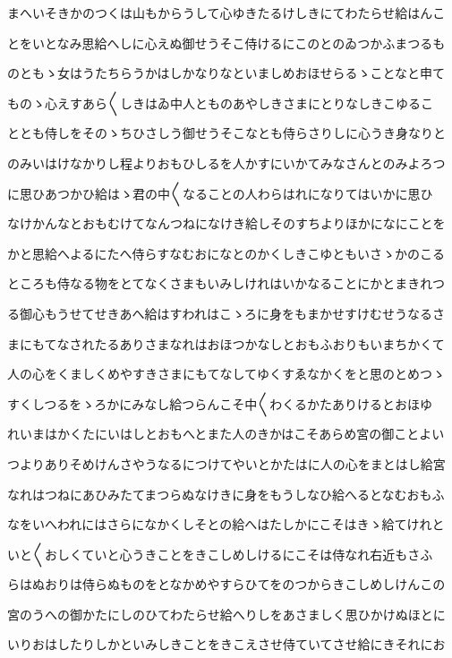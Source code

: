 \documentclass[a4paper,11pt,landscape]{ltjtarticle}
\begin{document}
まへいそきかのつくは山もからうして心ゆきたるけしきにてわたらせ給はんこ
\par\medskip
とをいとなみ思給へしに心えぬ御せうそこ侍けるにこのとのゐつかふまつるも
\par\medskip
のともゝ女はうたちらうかはしかなりなといましめおほせらるゝことなと申て
\par\medskip
ものゝ心えすあら〱しきはゐ中人とものあやしきさまにとりなしきこゆるこ
\par\medskip
ととも侍しをそのゝちひさしう御せうそこなとも侍らさりしに心うき身なりと
\par\medskip
のみいはけなかりし程よりおもひしるを人かすにいかてみなさんとのみよろつ
\par\medskip
に思ひあつかひ給はゝ君の中〱なることの人わらはれになりてはいかに思ひ
\par\medskip
なけかんなとおもむけてなんつねになけき給しそのすちよりほかになにことを
\par\medskip
かと思給へよるにたへ侍らすなむおになとのかくしきこゆともいさゝかのこる
\par\medskip
ところも侍なる物をとてなくさまもいみしけれはいかなることにかとまきれつ
\par\medskip
る御心もうせてせきあへ給はすわれはこゝろに身をもまかせすけむせうなるさ
\par\medskip
まにもてなされたるありさまなれはおほつかなしとおもふおりもいまちかくて
\par\medskip
人の心をくましくめやすきさまにもてなしてゆくすゑなかくをと思のとめつゝ
\par\medskip
すくしつるをゝろかにみなし給つらんこそ中〱わくるかたありけるとおほゆ
\par\medskip
れいまはかくたにいはしとおもへとまた人のきかはこそあらめ宮の御ことよい
\par\medskip
つよりありそめけんさやうなるにつけてやいとかたはに人の心をまとはし給宮
\par\medskip
なれはつねにあひみたてまつらぬなけきに身をもうしなひ給へるとなむおもふ
\par\medskip
なをいへわれにはさらになかくしそとの給へはたしかにこそはきゝ給てけれと
\par\medskip
いと〱おしくていと心うきことをきこしめしけるにこそは侍なれ右近もさふ
\par\medskip
らはぬおりは侍らぬものをとなかめやすらひてをのつからきこしめしけんこの
\par\medskip
宮のうへの御かたにしのひてわたらせ給へりしをあさましく思ひかけぬほとに
\par\medskip
いりおはしたりしかといみしきことをきこえさせ侍ていてさせ給にきそれにお
\end{document}
